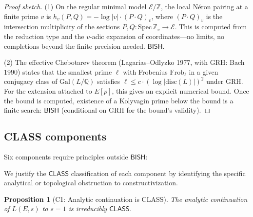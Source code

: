 \documentclass[11pt]{article}
\theoremstyle{plain}
\newtheorem{proposition}[theorem]{Proposition}
\theoremstyle{definition}
\theoremstyle{remark}
\newcommand{\Z}{\mathbb{Z}}
\newcommand{\Q}{\mathbb{Q}}
\newcommand{\Gal}{\mathrm{Gal}}
\newcommand{\Frob}{\mathrm{Frob}}
\newcommand{\BISH}{\ensuremath{\mathsf{BISH}}}
\newcommand{\CLASS}{\ensuremath{\mathsf{CLASS}}}
\begin{document}
\begin{proof}[Proof sketch]
(1) On the regular minimal model $\mathcal{E}/\Z$, the local N\'eron pairing at a finite prime $v$ is $h_v(P, Q) = -\log |v| \cdot (P \cdot Q)_v$, where $(P \cdot Q)_v$ is the intersection multiplicity of the sections $P, Q: \mathrm{Spec}\,\Z_v \to \mathcal{E}$. This is computed from the reduction type and the $v$-adic expansion of coordinates---no limits, no completions beyond the finite precision needed. $\BISH$.

(2) The effective Chebotarev theorem (Lagarias--Odlyzko 1977, with GRH: Bach 1990) states that the smallest prime $\ell$ with Frobenius $\Frob_\ell$ in a given conjugacy class of $\Gal(L/\Q)$ satisfies $\ell \leq c \cdot (\log |\mathrm{disc}(L)|)^2$ under GRH. For the extension attached to $E[p]$, this gives an explicit numerical bound. Once the bound is computed, existence of a Kolyvagin prime below the bound is a finite search: $\BISH$ (conditional on GRH for the bound's validity).
\end{proof}

\subsection{CLASS components}

Six components require principles outside $\BISH$:

We justify the $\CLASS$ classification of each component by identifying the specific analytical or topological obstruction to constructivization.

\begin{proposition}[C1: Analytic continuation is CLASS]\label{prop:C1}
The analytic continuation of $L(E,s)$ to $s = 1$ is irreducibly $\CLASS$.
\end{proposition}
\end{document}
